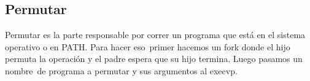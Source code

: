 \newpage
\subsection{Permutar}
Permutar es la parte responsable por correr un programa que está en el sistema operativo o en PATH. Para hacer eso\
primer hacemos un fork donde el hijo permuta la operación y el padre espera que su hijo termina. Luego pasamos un nombre\
de programa a permutar y sus argumentos al execvp.

